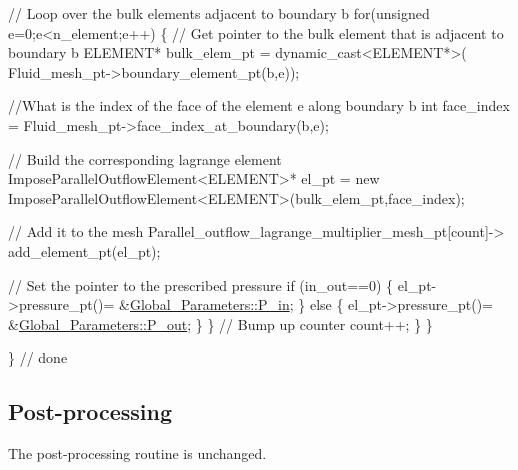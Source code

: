 \begin{DoxyCodeInclude}
     \textcolor{comment}{// Loop over the bulk elements adjacent to boundary b}
     \textcolor{keywordflow}{for}(\textcolor{keywordtype}{unsigned} e=0;e<n\_element;e++)
      \{
       \textcolor{comment}{// Get pointer to the bulk element that is adjacent to boundary b}
       ELEMENT* bulk\_elem\_pt = \textcolor{keyword}{dynamic\_cast<}ELEMENT*\textcolor{keyword}{>}(
        Fluid\_mesh\_pt->boundary\_element\_pt(b,e));
       
       \textcolor{comment}{//What is the index of the face of the element e along boundary b}
       \textcolor{keywordtype}{int} face\_index = Fluid\_mesh\_pt->face\_index\_at\_boundary(b,e);
       
       \textcolor{comment}{// Build the corresponding lagrange element}
       ImposeParallelOutflowElement<ELEMENT>* el\_pt = \textcolor{keyword}{new} 
        ImposeParallelOutflowElement<ELEMENT>(bulk\_elem\_pt,face\_index);
       
       \textcolor{comment}{// Add it to the mesh}
       Parallel\_outflow\_lagrange\_multiplier\_mesh\_pt[count]->
        add\_element\_pt(el\_pt);
       
       \textcolor{comment}{// Set the pointer to the prescribed pressure}
       \textcolor{keywordflow}{if} (in\_out==0)
        \{
         el\_pt->pressure\_pt()= &\hyperlink{namespaceGlobal__Parameters_a05b26d00935600b5e0149872844f224c}{Global\_Parameters::P\_in};
        \}
       \textcolor{keywordflow}{else}
        \{
         el\_pt->pressure\_pt()= &\hyperlink{namespaceGlobal__Parameters_ac680ed856897793d54c9c867da19169c}{Global\_Parameters::P\_out};
        \}
      \}
     \textcolor{comment}{// Bump up counter}
     count++;
    \}
  \}

\}  \textcolor{comment}{// done}

\end{DoxyCodeInclude}




 

\hypertarget{index_doc}{}\subsection{Post-\/processing}\label{index_doc}
The post-\/processing routine is unchanged.



